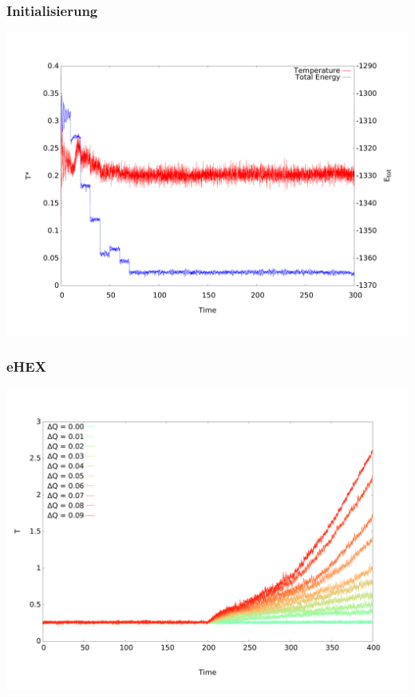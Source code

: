 \documentclass{beamer}
\begin{document}
\begin{frame}
\frametitle{Initialisierung}
\begin{center}
\includegraphics[scale=0.3]{../images/verlet_output_te.pdf}
\end{center}
\end{frame}

\begin{frame}
\frametitle{eHEX}
\begin{center}
\includegraphics[scale=0.3]{../images/ehex_temp_dq.pdf}
\end{center}
\end{frame}
\end{document}
